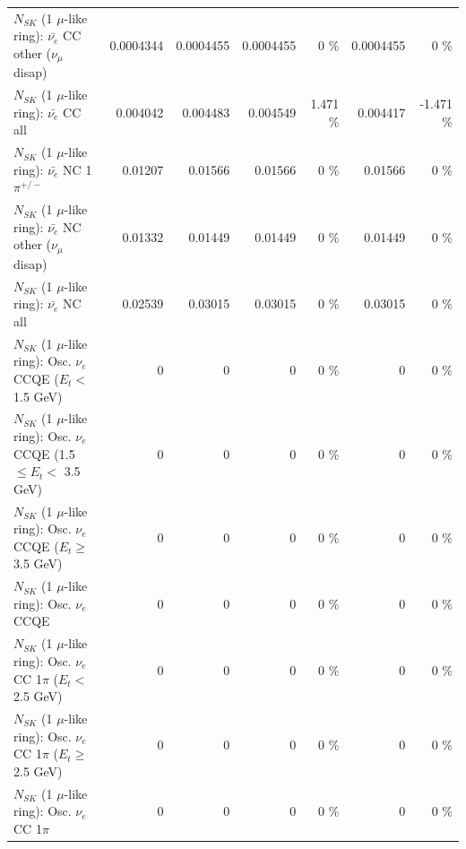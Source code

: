 \begin{table}
\begin{tabular}{| l | r | r | r  r | r  r |}
          $N_{SK}$ (1 $\mu$-like ring): $\bar{\nu_e}$ CC other ($\nu_\mu$ disap) &       0.0004344 &       0.0004455 &       0.0004455 &        0 \%  &       0.0004455 &        0 \%  \\ 
                            $N_{SK}$ (1 $\mu$-like ring): $\bar{\nu_{e}}$ CC all &        0.004042 &        0.004483 &        0.004549 &    1.471 \%  &        0.004417 &   -1.471 \%  \\ 
\hline
                     $N_{SK}$ (1 $\mu$-like ring): $\bar{\nu_e}$ NC 1$\pi^{+/-}$ &         0.01207 &         0.01566 &         0.01566 &        0 \%  &         0.01566 &        0 \%  \\ 
          $N_{SK}$ (1 $\mu$-like ring): $\bar{\nu_e}$ NC other ($\nu_\mu$ disap) &         0.01332 &         0.01449 &         0.01449 &        0 \%  &         0.01449 &        0 \%  \\ 
                            $N_{SK}$ (1 $\mu$-like ring): $\bar{\nu_{e}}$ NC all &         0.02539 &         0.03015 &         0.03015 &        0 \%  &         0.03015 &        0 \%  \\ 
\hline
\hline
\hline
             $N_{SK}$ (1 $\mu$-like ring): Osc. $\nu_e$ CCQE ($E_{t} <$ 1.5 GeV) &               0 &               0 &               0 &        0 \%  &               0 &        0 \%  \\ 
    $N_{SK}$ (1 $\mu$-like ring): Osc. $\nu_e$ CCQE (1.5 $\leq E_{t} <$ 3.5 GeV) &               0 &               0 &               0 &        0 \%  &               0 &        0 \%  \\ 
          $N_{SK}$ (1 $\mu$-like ring): Osc. $\nu_e$ CCQE ($E_{t} \geq$ 3.5 GeV) &               0 &               0 &               0 &        0 \%  &               0 &        0 \%  \\ 
\hline
                                 $N_{SK}$ (1 $\mu$-like ring): Osc. $\nu_e$ CCQE &               0 &               0 &               0 &        0 \%  &               0 &        0 \%  \\ 
\hline
        $N_{SK}$ (1 $\mu$-like ring): Osc. $\nu_e$ CC 1$\pi$ ($E_{t} <$ 2.5 GeV) &               0 &               0 &               0 &        0 \%  &               0 &        0 \%  \\ 
     $N_{SK}$ (1 $\mu$-like ring): Osc. $\nu_e$ CC 1$\pi$ ($E_{t} \geq$ 2.5 GeV) &               0 &               0 &               0 &        0 \%  &               0 &        0 \%  \\ 
\hline
                            $N_{SK}$ (1 $\mu$-like ring): Osc. $\nu_e$ CC 1$\pi$ &               0 &               0 &               0 &        0 \%  &               0 &        0 \%  \\ 

\end{tabular}
\end{table}
